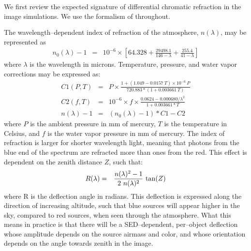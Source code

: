 \documentclass[prd, nofootinbib, floatfix, 11pt, tightenlines, times]{article}
\begin{document}
We first review the expected signature of differential chromatic
refraction in the image simulations.  We use the formalism of
\cite{1982PASP...94..715F} throughout.

The wavelength--dependent index of refraction of the atmosphere,
$n(\lambda)$, may be represented as
\begin{eqnarray}
\label{eqn:dcr0}
n_0(\lambda) - 1 & = & 10^{-6} \times \left[ 64.328 + \frac{29498.1}{146 - \lambda} + \frac{255.4}{41 - \lambda} \right]
\end{eqnarray}
where $\lambda$ is the wavelength in microns.  Temperature, pressure,
and water vapor corrections may be expressed as:
\begin{eqnarray}
\label{eqn:dcr}
C1(P,T) & = & P \times \frac{1 + (1.049 - 0.0157~T) \times 10^{-6}~P}{720.883 * (1 + 0.003661~T)} \\
C2(f,T) & = & 10^{-6} \times f \times \frac{0.0624 - 0.000680/\lambda^2}{1 + 0.003661 * T} \\
n(\lambda) - 1 & = & (n_0(\lambda) - 1) * C1 - C2 
\end{eqnarray}
where $P$ is the ambient pressure in mm of mercury, $T$ is the
temperature in Celsius, and $f$ is the water vapor pressure in mm of
mercury.  The index of refraction is larger for shorter wavelength
light, meaning that photons from the blue end of the spectrum are
refracted more than ones from the red.  This effect is dependent on
the zenith distance $Z$, such that:
\begin{eqnarray}
R(\lambda) & = & \frac{n(\lambda)^2 - 1}{2~n(\lambda)^2}~{\rm tan}(Z)
\end{eqnarray}
where R is the deflection angle in radians.  This deflection is
expressed along the direction of increasing altitude, such that blue
sources will appear higher in the sky, compared to red sources, when
seen through the atmosphere.  What this means in practice is that
there will be a SED--dependent, per--object deflection whose amplitude
depends on the source airmass and color, and whose orientation depends
on the angle towards zenith in the image.
\end{document}
